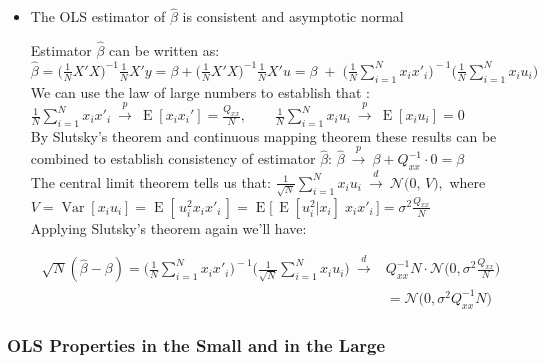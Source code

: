 \documentclass[a4paper,12pt]{article}
\begin{document}
\begin{itemize}
\item The OLS estimator of $\hat\beta$ is consistent and asymptotic normal

Estimator $\hat\beta$ can be written as: $\hat\beta = \big(\tfrac{1}{N}X'X\big)^{-1}\tfrac{1}{N}X'y
                  = \beta + \big(\tfrac{1}{N}X'X\big)^{-1}\tfrac{1}{N}X'u
                  = \beta\; + \;\bigg(\frac{1}{N}\sum_{i=1}^N x_ix'_i\bigg)^{\!\!-1} \bigg(\frac{1}{N}\sum_{i=1}^N x_iu_i\bigg)$\\[1ex]
We can use the law of large numbers to establish that
: $\frac{1}{N}\sum_{i=1}^N x_ix'_i\ \xrightarrow{p}\ \operatorname{E}[x_ix_i']=\frac{Q_{xx}}{N}, \qquad
        \frac{1}{N}\sum_{i=1}^N x_iu_i\ \xrightarrow{p}\ \operatorname{E}[x_iu_i]=0$\\[1ex]
By Slutsky's theorem and continuous mapping theorem these results can be combined to establish consistency of estimator $\hat\beta$: $\hat\beta\ \xrightarrow{p}\ \beta + Q_{xx}^{-1}\cdot 0 = \beta$\\[1ex]

The central limit theorem tells us that: $\frac{1}{\sqrt{N}}\sum_{i=1}^N x_iu_i\ \xrightarrow{d}\ \mathcal{N}\big(0,\,V\big),$ where  $V = \operatorname{Var}[x_iu_i] = \operatorname{E}[\,u_i^2x_ix'_i\,] = \operatorname{E}\big[\,\operatorname{E}[u_i^2|x_i]\;x_ix'_i\,\big] = \sigma^2 \frac{Q_{xx}}{N}$\\[1ex]

Applying Slutsky's theorem again we'll have:

$$\begin{aligned}\sqrt{N}(\hat\beta-\beta) = \bigg(\frac{1}{N}\sum_{i=1}^N x_ix'_i\bigg)^{\!\!-1} \bigg(\frac{1}{\sqrt{N}}\sum_{i=1}^N x_iu_i\bigg) \ \xrightarrow{d} &Q_{xx}^{-1}N\cdot\mathcal{N}\big(0, \sigma^2\frac{Q_{xx}}{N}\big)\\ & = \mathcal{N}\big(0,\sigma^2Q_{xx}^{-1}N\big)\end{aligned}$$

\end{itemize}


\subsubsection*{OLS Properties in the Small and in the Large}
\end{document}
